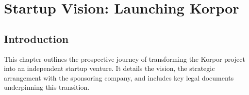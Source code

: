 \chapter{Startup Vision: Launching Korpor}


\section{Introduction}

This chapter outlines the prospective journey of transforming the Korpor project into an independent startup venture. It details the vision, the strategic arrangement with the sponsoring company, and includes key legal documents underpinning this transition.

\vspace{1cm} %

